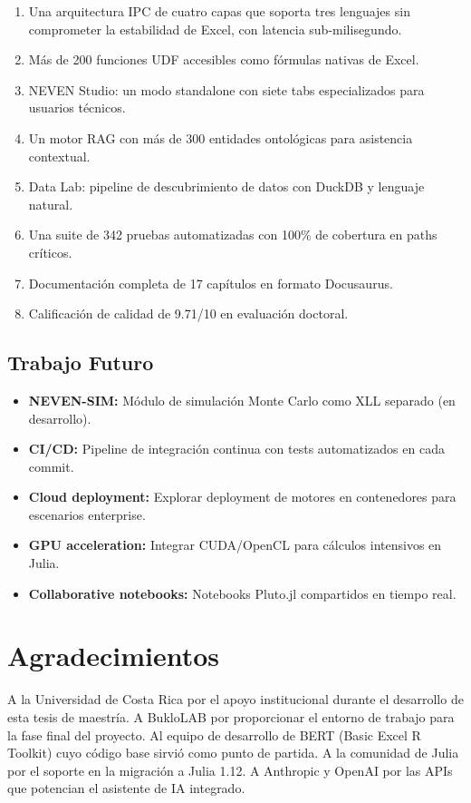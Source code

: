 \documentclass[12pt, a4paper]{report}
\begin{document}
\begin{enumerate}
    \item Una arquitectura IPC de cuatro capas que soporta tres lenguajes sin comprometer la estabilidad de Excel, con latencia sub-milisegundo.
    \item Más de 200 funciones UDF accesibles como fórmulas nativas de Excel.
    \item NEVEN Studio: un modo standalone con siete tabs especializados para usuarios técnicos.
    \item Un motor RAG con más de 300 entidades ontológicas para asistencia contextual.
    \item Data Lab: pipeline de descubrimiento de datos con DuckDB y lenguaje natural.
    \item Una suite de 342 pruebas automatizadas con 100\% de cobertura en paths críticos.
    \item Documentación completa de 17 capítulos en formato Docusaurus.
    \item Calificación de calidad de 9.71/10 en evaluación doctoral.
\end{enumerate}

\section{Trabajo Futuro}

\begin{itemize}
    \item \textbf{NEVEN-SIM:} Módulo de simulación Monte Carlo como XLL separado (en desarrollo).
    \item \textbf{CI/CD:} Pipeline de integración continua con tests automatizados en cada commit.
    \item \textbf{Cloud deployment:} Explorar deployment de motores en contenedores para escenarios enterprise.
    \item \textbf{GPU acceleration:} Integrar CUDA/OpenCL para cálculos intensivos en Julia.
    \item \textbf{Collaborative notebooks:} Notebooks Pluto.jl compartidos en tiempo real.
\end{itemize}

\chapter*{Agradecimientos}

A la Universidad de Costa Rica por el apoyo institucional durante el desarrollo de esta tesis de maestría. A BukloLAB por proporcionar el entorno de trabajo para la fase final del proyecto. Al equipo de desarrollo de BERT (Basic Excel R Toolkit) cuyo código base sirvió como punto de partida. A la comunidad de Julia por el soporte en la migración a Julia 1.12. A Anthropic y OpenAI por las APIs que potencian el asistente de IA integrado.
\end{document}
